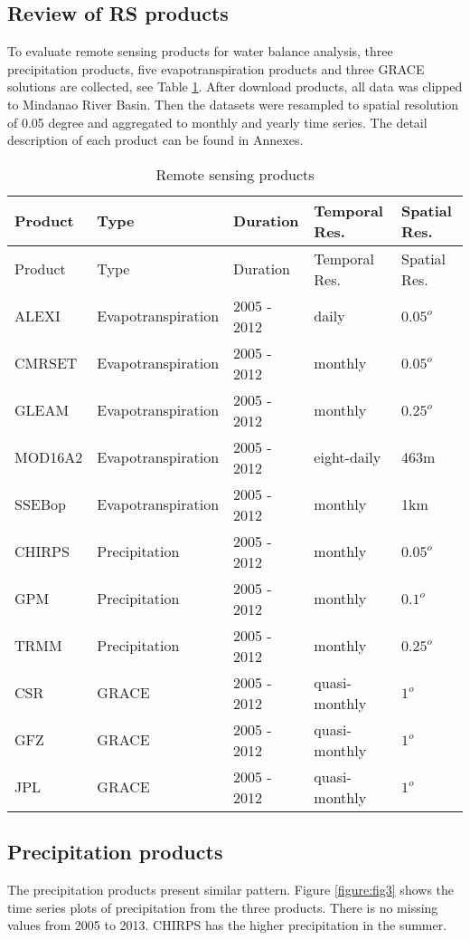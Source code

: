\documentclass{article}%
\begin{document}
\subsection{Review of RS products}%
\label{subsec:ReviewofRSproducts}%
To evaluate remote sensing products for water balance analysis, three precipitation products, five evapotranspiration products and three GRACE solutions are collected, see Table \ref{table:tab1}. After download products, all data was clipped to Mindanao River Basin. Then the datasets were resampled to spatial resolution of 0.05 degree and aggregated to monthly and yearly time series. The detail description of each product can be found in Annexes.%
\linebreak%
\begin{longtable}{|l|l|l|l|l|}%
\caption{Remote sensing products}%
\label{table:tab1}\\%
\hline%
Product&Type&Duration&Temporal Res.&Spatial Res.\\%
\hline%
\endfirsthead%
\hline%
Product&Type&Duration&Temporal Res.&Spatial Res.\\%
\hline%
\endhead%
\hline%
\endfoot%
ALEXI&Evapotranspiration&2005 - 2012&daily&$0.05^{o}$\\%
CMRSET&Evapotranspiration&2005 - 2012&monthly&$0.05^{o}$\\%
GLEAM&Evapotranspiration&2005 - 2012&monthly&$0.25^{o}$\\%
MOD16A2&Evapotranspiration&2005 - 2012&eight-daily&463m\\%
SSEBop&Evapotranspiration&2005 - 2012&monthly&1km\\%
CHIRPS&Precipitation&2005 - 2012&monthly&$0.05^{o}$\\%
GPM&Precipitation&2005 - 2012&monthly&$0.1^{o}$\\%
TRMM&Precipitation&2005 - 2012&monthly&$0.25^{o}$\\%
CSR&GRACE&2005 - 2012&quasi-monthly&$1^{o}$\\%
GFZ&GRACE&2005 - 2012&quasi-monthly&$1^{o}$\\%
JPL&GRACE&2005 - 2012&quasi-monthly&$1^{o}$\\%
\end{longtable}%
\subsection{Precipitation products}%
\label{subsec:Precipitationproducts}%
The precipitation products present similar pattern. Figure \ref{figure:fig3} shows the time series plots of precipitation from the three products. There is no missing values from 2005 to 2013. CHIRPS has the higher precipitation in the summer.%
\linebreak%
\end{document}
